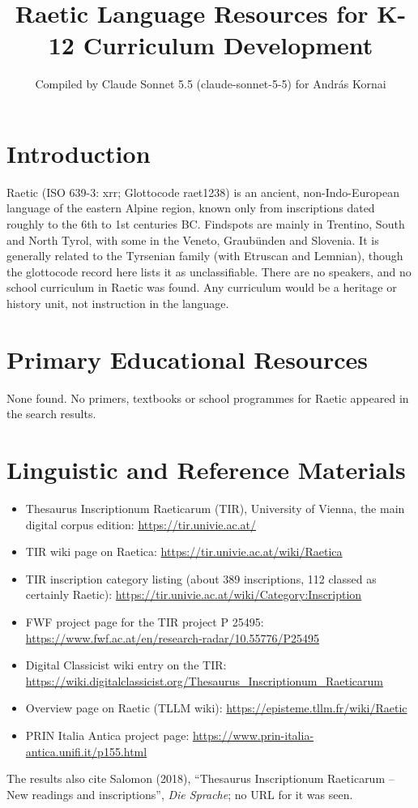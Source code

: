 \documentclass[12pt]{article}
\title{Raetic Language Resources for K-12 Curriculum Development}
\author{Compiled by Claude Sonnet 5.5 (claude-sonnet-5-5) for Andr\'as Kornai}
\date{}
\begin{document}
\maketitle

\section{Introduction}
Raetic (ISO 639-3: xrr; Glottocode raet1238) is an ancient, non-Indo-European language of the eastern Alpine region, known only from inscriptions dated roughly to the 6th to 1st centuries BC. Findspots are mainly in Trentino, South and North Tyrol, with some in the Veneto, Graub\"unden and Slovenia. It is generally related to the Tyrsenian family (with Etruscan and Lemnian), though the glottocode record here lists it as unclassifiable. There are no speakers, and no school curriculum in Raetic was found. Any curriculum would be a heritage or history unit, not instruction in the language.

\section{Primary Educational Resources}
None found. No primers, textbooks or school programmes for Raetic appeared in the search results.

\section{Linguistic and Reference Materials}
\begin{itemize}
\item Thesaurus Inscriptionum Raeticarum (TIR), University of Vienna, the main digital corpus edition: \url{https://tir.univie.ac.at/}
\item TIR wiki page on Raetica: \url{https://tir.univie.ac.at/wiki/Raetica}
\item TIR inscription category listing (about 389 inscriptions, 112 classed as certainly Raetic): \url{https://tir.univie.ac.at/wiki/Category:Inscription}
\item FWF project page for the TIR project P 25495: \url{https://www.fwf.ac.at/en/research-radar/10.55776/P25495}
\item Digital Classicist wiki entry on the TIR: \url{https://wiki.digitalclassicist.org/Thesaurus_Inscriptionum_Raeticarum}
\item Overview page on Raetic (TLLM wiki): \url{https://episteme.tllm.fr/wiki/Raetic}
\item PRIN Italia Antica project page: \url{https://www.prin-italia-antica.unifi.it/p155.html}
\end{itemize}
The results also cite Salomon (2018), ``Thesaurus Inscriptionum Raeticarum -- New readings and inscriptions'', \emph{Die Sprache}; no URL for it was seen.
\end{document}
